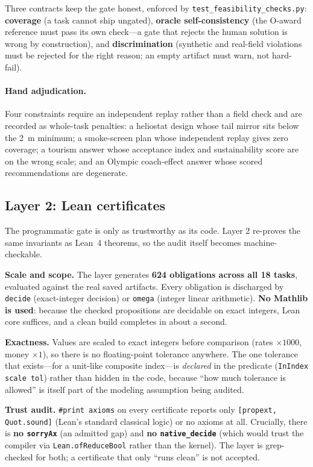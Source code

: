 Three contracts keep the gate honest, enforced by \texttt{test\_feasibility\_checks.py}:
\textbf{coverage} (a task cannot ship ungated), \textbf{oracle self-consistency} (the O-award reference must pass its own check---a gate that rejects the human solution is wrong by construction), and \textbf{discrimination} (synthetic and real-field violations must be rejected for the right reason; an empty artifact must warn, not hard-fail).

\paragraph{Hand adjudication.} Four constraints require an independent replay rather than a field check and are recorded as whole-task penalties: a heliostat design whose tail mirror sits below the 2~m minimum; a smoke-screen plan whose independent replay gives zero coverage; a tourism answer whose acceptance index and sustainability score are on the wrong scale; and an Olympic coach-effect answer whose scored recommendations are degenerate.

\subsection{Layer 2: Lean certificates}
The programmatic gate is only as trustworthy as its code. Layer 2 re-proves the same invariants as Lean~4 theorems, so the audit itself becomes machine-checkable.

\textbf{Scale and scope.} The layer generates \textbf{624 obligations across all 18 tasks}, evaluated against the real saved artifacts. Every obligation is discharged by \texttt{decide} (exact-integer decision) or \texttt{omega} (integer linear arithmetic). \textbf{No Mathlib is used}: because the checked propositions are decidable on exact integers, Lean core suffices, and a clean build completes in about a second.

\textbf{Exactness.} Values are scaled to exact integers before comparison (rates $\times1000$, money $\times1$), so there is no floating-point tolerance anywhere. The one tolerance that exists---for a unit-like composite index---is \emph{declared} in the predicate (\texttt{InIndex scale tol}) rather than hidden in the code, because ``how much tolerance is allowed'' is itself part of the modeling assumption being audited.

\textbf{Trust audit.} \texttt{\#print axioms} on every certificate reports only \texttt{[propext, Quot.sound]} (Lean's standard classical logic) or no axioms at all. Crucially, there is \textbf{no \texttt{sorryAx}} (an admitted gap) and \textbf{no \texttt{native\_decide}} (which would trust the compiler via \texttt{Lean.ofReduceBool} rather than the kernel). The layer is grep-checked for both; a certificate that only ``runs clean'' is not accepted.

